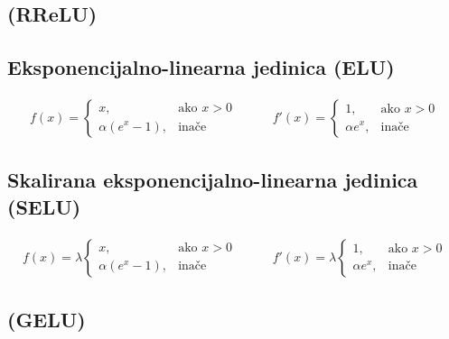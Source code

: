 \documentclass[times, utf8, diplomski]{fer}
\begin{document}
\subsection*{(RReLU)}

\subsection*{Eksponencijalno-linearna jedinica (ELU)}

\begin{equation}
\begin{split}
f(x) = 
\begin{cases}
x,					& \text{ako } x > 0 \\
\alpha (e^x - 1),	&  \text{inače}
\end{cases}
\end{split}
\qquad
\begin{split}
f'(x) = 
\begin{cases}
1,	 		& \text{ako } x > 0 \\
\alpha e^x,	& \text{inače}
\end{cases}
\end{split}
\end{equation}

\subsection*{Skalirana eksponencijalno-linearna jedinica (SELU)}

\begin{equation}
\begin{split}
f(x) = \lambda
\begin{cases}
x,					& \text{ako } x > 0 \\
\alpha (e^x - 1),	&  \text{inače}
\end{cases}
\end{split}
\qquad
\begin{split}
f'(x) = \lambda
\begin{cases}
1,	 		& \text{ako } x > 0 \\
\alpha e^x,	& \text{inače}
\end{cases}
\end{split}
\end{equation}

\subsection*{(GELU)}
\end{document}
